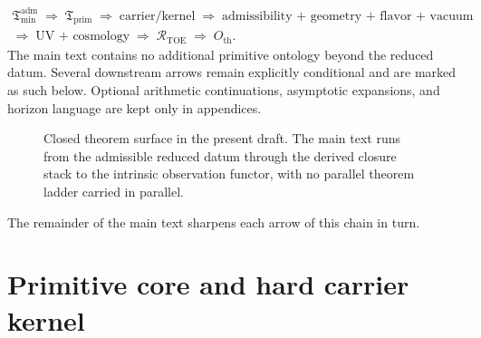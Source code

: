 \documentclass[11pt,a4paper]{article}
\theoremstyle{definition}
\theoremstyle{remark}
\newcommand{\Tmin}{\mathfrak T_{\mathrm{min}}}
\newcommand{\Tprim}{\mathfrak T_{\mathrm{prim}}}
\begin{document}
\begin{tcolorbox}[colback=tfptorange!4, colframe=tfptorange!80!black, breakable,
    title={Closed Theorem Stack in the Present Version}, colbacktitle=tfptorange!85!black]
\begin{gather*}
\Tmin^{\mathrm{adm}}
\;\Rightarrow\;
\Tprim
\;\Rightarrow\;
\text{carrier/kernel}
\;\Rightarrow\;
\text{admissibility + geometry + flavor + vacuum}\\[2pt]
\Rightarrow\;
\text{UV + cosmology}
\;\Rightarrow\;
\mathcal R_{\mathrm{TOE}}
\;\Rightarrow\;
O_{\mathrm{th}}.
\end{gather*}
The main text contains no additional primitive ontology beyond the reduced datum.
Several downstream arrows remain explicitly conditional and are marked as such below.
Optional arithmetic continuations, asymptotic expansions, and horizon language are kept only in appendices.
\end{tcolorbox}

\begin{figure}[t]
\centering
\scriptsize
{}
\caption{Closed theorem surface in the present draft. The main text runs from the admissible
reduced datum through the derived closure stack to the intrinsic observation functor, with no
parallel theorem ladder carried in parallel.}
\label{fig:status-ladder}
\end{figure}

The remainder of the main text sharpens each arrow of this chain in turn.

\section{Primitive core and hard carrier kernel}
\end{document}

